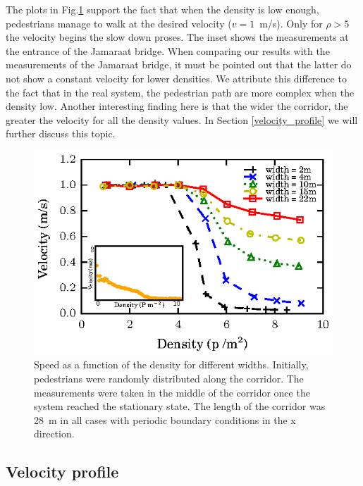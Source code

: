 The plots in Fig.\ref{fundamental_diagram_speed} support the fact that when the density is low enough, pedestrians manage to walk at the desired velocity ($v=1$~m/s). Only for $\rho>5$ the velocity begins the slow down proses. The inset shows the measurements at the entrance of the Jamaraat bridge. When comparing our results with the measurements of the Jamaraat bridge, it must be pointed out that the latter do not show a constant velocity for lower densities. We attribute this difference to the fact that in the real system, the pedestrian path are more complex when the density low. Another interesting finding here is that the wider the corridor, the greater the velocity for all the density values. In Section \ref{velocity_profile} we will further discuss this topic.

\begin{figure}[htbp!]
\includegraphics[width=\columnwidth]
{plots/speed-density_vd1_multiple_widths.eps}
\caption{\label{fundamental_diagram_speed} Speed as a function of the density for different widths. Initially, 
pedestrians were randomly distributed along the corridor. The measurements were taken in the middle
of the corridor once the system reached the stationary state. The length of the corridor 
was 28~m in all cases with periodic boundary conditions in the x direction.}
\end{figure}

\subsection{\label{velocity_profile} Velocity profile}

